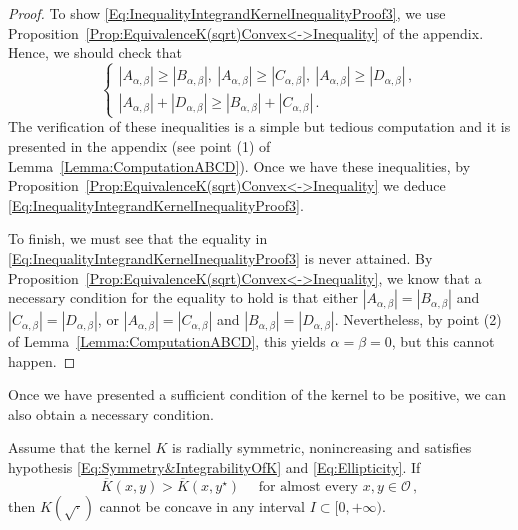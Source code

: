 \begin{proof}
To show \eqref{Eq:InequalityIntegrandKernelInequalityProof3}, we use
Proposition~\ref{Prop:EquivalenceK(sqrt)Convex<->Inequality} of the appendix. Hence, we should
check that
$$
\begin{cases}
|A_{\alpha,\beta}| \geq |B_{\alpha,\beta}|,\ |A_{\alpha,\beta}| \geq |C_{\alpha,\beta}|, \ |A_{\alpha,\beta}| \geq |D_{\alpha,\beta}|\,, \\
|A_{\alpha,\beta}| + |D_{\alpha,\beta}| \geq |B_{\alpha,\beta}| + |C_{\alpha,\beta}|\,.
\end{cases}
$$
The verification of these inequalities is a simple but tedious computation and it is presented in
the appendix (see point (1) of Lemma~\ref{Lemma:ComputationABCD}). Once we have these inequalities,
by Proposition~\ref{Prop:EquivalenceK(sqrt)Convex<->Inequality} we deduce
\eqref{Eq:InequalityIntegrandKernelInequalityProof3}.

To finish, we must see that the equality in \eqref{Eq:InequalityIntegrandKernelInequalityProof3} is
never attained. By Proposition~\ref{Prop:EquivalenceK(sqrt)Convex<->Inequality}, we know that a
necessary condition for the equality to hold is that either $|A_{\alpha,\beta}| =
|B_{\alpha,\beta}|$ and $|C_{\alpha,\beta}| = |D_{\alpha,\beta}|$, or $|A_{\alpha,\beta}| =
|C_{\alpha,\beta}|$ and $|B_{\alpha,\beta}| = |D_{\alpha,\beta}|$. Nevertheless, by point (2) of
Lemma~\eqref{Lemma:ComputationABCD}, this yields $\alpha = \beta = 0$, but this cannot happen.
\end{proof}

Once we have presented a sufficient condition of the kernel to be positive, we can also obtain a
necessary condition.


\begin{proposition}
\label{Prop:ContraryKernelInequalityReflexion} Assume that the kernel $K$ is radially symmetric,
nonincreasing and satisfies hypothesis \eqref{Eq:Symmetry&IntegrabilityOfK} and
\eqref{Eq:Ellipticity}. If
\begin{equation}
\label{Eq:KernelInequalityReflexion2}
\overline{K}(x,y) > \overline{K}(x, y^\star) \quad \text{ for almost every }x,y \in \mathcal{O}\,,
\end{equation}
then $K(\sqrt{\cdot})$ cannot be concave in any interval $I\subset [0,+\infty)$.
\end{proposition}

